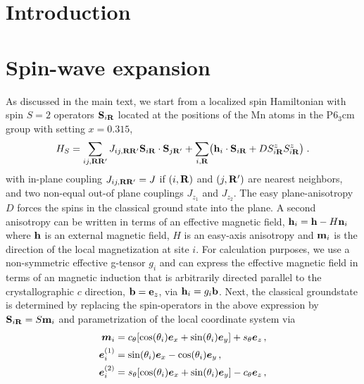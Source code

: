 \documentclass[aps,prl,twocolumn,superscriptaddress,amsmath,amssymb,floats,aps,10pt]{revtex4-1}
\begin{document}
\maketitle
\section{Introduction}

\section{Spin-wave expansion}
As discussed in the main text, we start from a localized spin Hamiltonian with spin $S=2$ operators
${\bf S}_{i\bf R}$ located at the positions of the Mn atoms\cite{Mn_positions} in the P6$_3$cm group with setting
$x=0.315$\cite{Petit2007,Toulouse2014},
\begin{equation}
 H_S=\sum_{ij, \bf R \bf R'}J_{ij,{\bf R}  {\bf R}'} {\bf S}_{i\bf R}\cdot {\bf S}_{j {\bf R}'}+\sum_{i, \bf R}\bigl( {\bf h}_{i}\cdot {\bf S}_{i \bf R}+D S_{i\bf R}^z S_{i\bf R}^z\bigr)\;.\label{eq_HS}
\end{equation}
with in-plane coupling $J_{ij,{\bf R}  {\bf R}'}=J$ if $(i,{\bf R})$ and $(j,{\bf R}')$ are nearest neighbors, and two non-equal out-of plane couplings
$J_{z_1}$ and $J_{z_2}$. The easy plane-anisotropy $D$ forces the spins in the classical ground state into the plane.
A second anisotropy can be written in terms of an effective magnetic field, ${\bf h}_{i}={\bf h}-H{\bf n}_i$ where $\bf h$ is an external magnetic field, $H$ is an easy-axis anisotropy
and ${\bf m}_i$ is the direction of the local magnetization at site $i$. 
For calculation purposes, we use a non-symmetric effective g-tensor $g_i$ and can express the effective magnetic field in terms
of an magnetic induction that is arbitrarily directed parallel to the crystallographic $c$ direction, ${\bf b}={\bf e}_z$, via ${\bf h}_i=g_i{\bf b}$.
Next, the classical groundstate is determined by replacing the spin-operators in the above expression by ${\bf S}_{i\bf R}=S{\bf m}_i$ and parametrization of
the local coordinate system via
\begin{subequations}
 \begin{align}
  \bm m_i&=c_\theta [\cos(\theta_i)\bm e_x +\sin(\theta_i)\bm e_y] +s_\theta \bm e_z \,,\\
    \bm e_i^{(1)}&=\sin(\theta_i)\bm e_x -\cos(\theta_i)\bm e_y\,,\\
    \bm e_i^{(2)}&=s_\theta [\cos(\theta_i)\bm e_x +\sin(\theta_i)\bm e_y]-c_\theta \bm e_z\,,\label{eq_loc_coord_h}
 \end{align}
\end{subequations}
\end{document}
